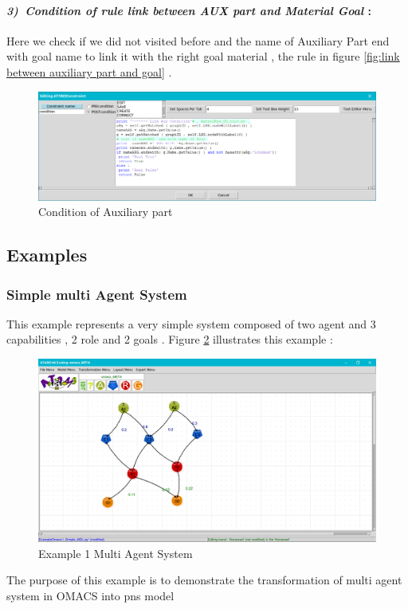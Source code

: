 \paragraph{\emph{3)~Condition of rule link between AUX part and Material Goal } : }
Here we check if we did not visited before  and the name of Auxiliary Part end with goal name to link it with the right goal material , the rule in figure \ref{fig:link between auxiliary part and goal}  .
 
\vspace{1cm}
 
\begin{figure}[th]
	\centering
 	\includegraphics[scale=0.37]{Chapiter3/img/condaux}
	\caption{\label{fig:Condition of Auxiliary part}Condition of Auxiliary part  }
\end{figure} 



 
\subsection{ Examples }

\subsubsection{ Simple multi Agent System }
This example represents a very simple system composed of  two agent and 3 capabilities , 2 role and 2 goals  .
 Figure \ref{fig:Example 1 Multi Agent System } illustrates this example :
\begin{figure}[th]
	\centering
 	\includegraphics[scale=0.3]{Chapiter3/img/omacs_model}
	\caption{\label{fig:Example 1 Multi Agent System }Example 1 Multi Agent System}
\end{figure} 
\pagebreak
The purpose of this example is to demonstrate the transformation of multi agent system in OMACS into pns model

